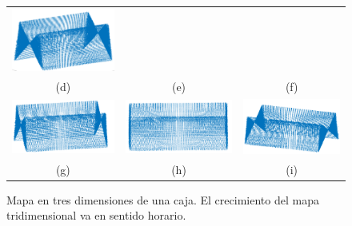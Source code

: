 \begin{figure}[ht!]
\begin{tabular}{ccc}
        \includegraphics[width=.32\textwidth]{images/caja3D_6.png}\\
        (d)&(e)&(f)\\
        \includegraphics[width=.32\textwidth]{images/caja3D_7.png}&
        \includegraphics[width=.32\textwidth]{images/caja3D_8.png}&
        \includegraphics[width=.32\textwidth]{images/caja3D_9.png}\\
        (g)&(h)&(i)
    \end{tabular}
  \captionsetup{font=footnotesize}
    \caption{\label{fig:Caja3D}Mapa en tres dimensiones de una caja. El crecimiento del mapa tridimensional 
    va en sentido horario.}
\end{figure}


